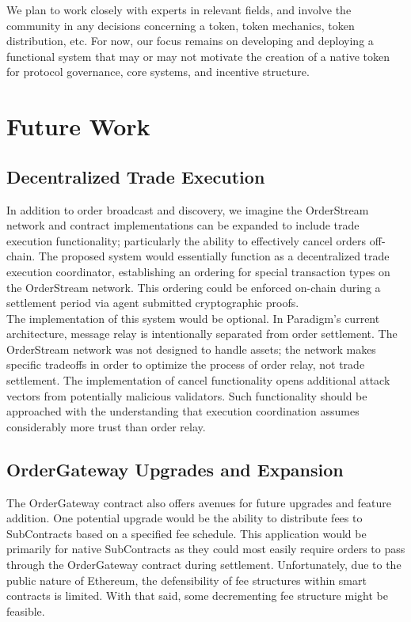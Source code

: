 \documentclass[9pt]{article}
\begin{document}
\noindent We plan to work closely with experts in relevant fields, and involve the community in any decisions concerning a token, token mechanics, token distribution, etc. For now, our focus remains on developing and deploying a functional system that may or may not motivate the creation of a native token for protocol governance, core systems, and incentive structure.

\clearpage
\pagebreak


\section{Future Work}\label{future work}
\subsection{Decentralized Trade Execution}
\noindent In addition to order broadcast and discovery, we imagine the OrderStream network and contract implementations can be expanded to include trade execution functionality; particularly the ability to effectively cancel orders off-chain. The proposed system would essentially function as a decentralized trade execution coordinator, establishing an ordering for special transaction types on the OrderStream network. This ordering could be enforced on-chain during a settlement period via agent submitted cryptographic proofs. \\

\noindent The implementation of this system would be optional. In Paradigm’s current architecture, message relay is intentionally separated from order settlement. The OrderStream network was not designed to handle assets; the network makes specific tradeoffs in order to optimize the process of order relay, not trade settlement. The implementation of cancel functionality opens additional attack vectors from potentially malicious validators. Such functionality should be approached with the understanding that execution coordination assumes considerably more trust than order relay.

\subsection{OrderGateway Upgrades and Expansion}\label{ordergateway future}
\noindent The OrderGateway contract also offers avenues for future upgrades and feature addition. One potential upgrade would be the ability to distribute fees to SubContracts based on a specified fee schedule. This application would be primarily for native SubContracts as they could most easily require orders to pass through the OrderGateway contract during settlement. Unfortunately, due to the public nature of Ethereum, the defensibility of fee structures within smart contracts is limited. With that said, some decrementing fee structure might be feasible. \\
\end{document}
